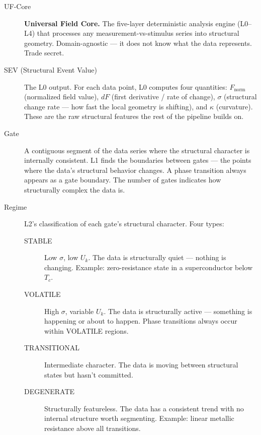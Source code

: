 \documentclass[11pt,letterpaper]{article}
\begin{document}
\begin{description}

  \item[UF-Core] \textbf{Universal Field Core.} The five-layer
    deterministic analysis engine (L0--L4) that processes any
    measurement-vs-stimulus series into structural geometry. Domain-agnostic
    --- it does not know what the data represents. Trade secret.

  \item[SEV (Structural Event Value)] The L0 output. For each data
    point, L0 computes four quantities: $F_{\text{norm}}$ (normalized
    field value), $dF$ (first derivative / rate of change), $\sigma$
    (structural change rate --- how fast the local geometry is
    shifting), and $\kappa$ (curvature). These are the raw structural
    features the rest of the pipeline builds on.

  \item[Gate] A contiguous segment of the data series where the
    structural character is internally consistent. L1 finds the
    boundaries between gates --- the points where the data's
    structural behavior changes. A phase transition always appears
    as a gate boundary. The number of gates indicates how structurally
    complex the data is.

  \item[Regime] L2's classification of each gate's structural
    character. Four types:
    \begin{description}
      \item[STABLE] Low $\sigma$, low $U_k$. The data is structurally
        quiet --- nothing is changing. Example: zero-resistance state
        in a superconductor below $T_c$.
      \item[VOLATILE] High $\sigma$, variable $U_k$. The data is
        structurally active --- something is happening or about to
        happen. Phase transitions always occur within VOLATILE regions.
      \item[TRANSITIONAL] Intermediate character. The data is moving
        between structural states but hasn't committed.
      \item[DEGENERATE] Structurally featureless. The data has a
        consistent trend with no internal structure worth segmenting.
        Example: linear metallic resistance above all transitions.
    \end{description}


\end{description}
\end{document}
